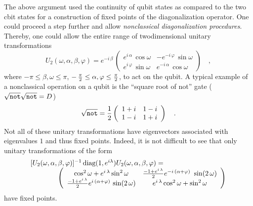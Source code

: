 \documentclass[prl,preprint,showpacs,showkeys,amsfonts,amsmath]{revtex4}
\begin{document}
The above argument used the continuity of qubit states as compared to the
two cbit states for a construction of fixed points of the
diagonalization operator. One could proceed a step further and allow
{\em nonclassical diagonalization procedures}. Thereby, one could allow
the entire range of twodimensional unitary transformations
\cite{murnaghan}
\begin{equation}
U_2(\omega ,\alpha ,\beta ,\varphi )=e^{-i\,\beta}\,
\left(
\begin{array}{cc}
{e^{i\,\alpha }}\,\cos \omega
&
{-e^{-i\,\varphi }}\,\sin \omega
\\
{e^{i\,\varphi }}\,\sin \omega
&
{e^{-i\,\alpha }}\,\cos \omega
 \end{array}
\right)
 \quad ,
\label{e:quid3}
\end{equation}
where $-\pi \le \beta ,\omega \le \pi$,
$-\, {\pi \over 2} \le  \alpha ,\varphi \le {\pi \over 2}$, to act on
the qubit.
A typical example of a nonclassical operation on a qubit is
the ``square root of not'' gate
($
\sqrt{{\tt not}}
\sqrt{{\tt not}} =D$)
\begin{equation}
\sqrt{{\tt not}} =
{1 \over 2}
\left(
\begin{array}{cc}
1+i&1-i
\\
1-i&1+i
 \end{array}
\right)
\quad .
\end{equation}
Not all of these unitary transformations have eigenvectors
associated with eigenvalues $1$ and thus fixed points.
Indeed, it is not difficult to see that only
unitary transformations of the form
\begin{equation}
\begin{array}{l}
[U_2(\omega ,\alpha ,\beta ,\varphi )]^{-1}\,\mbox{diag}(1, e^{i\lambda
}) U_2(\omega ,\alpha ,\beta ,\varphi )= \\
\qquad
\qquad
\left(
\begin{array}{cc}
{{\cos^2 \omega }} + {e^{i\,\lambda }}\,{{\sin^2 \omega }}&
{{{
{-1 + {e^{i\,\lambda
}}\over 2}
e^{-i\,\left(\alpha +\varphi \right) }}\,
\, \sin (2\,\omega )}} \\
{ -1 + {e^{i\,\lambda }}\over 2}
 {{{e^{i\,\left(\alpha
+\varphi \right) }}\,
 \sin
(2\,\omega )}}&
{e^{i\,\lambda }}\,{{\cos^2 \omega }} + {{\sin^2 \omega }}
 \end{array}
\right)
 \end{array}
\end{equation}
have fixed points.
\end{document}
